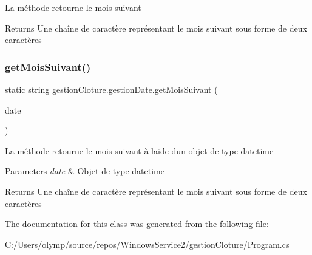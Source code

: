 La méthode retourne le mois suivant 

\begin{DoxyReturn}{Returns}
Une chaîne de caractère représentant le mois suivant sous forme de deux caractères
\end{DoxyReturn}
\mbox{\label{classgestion_cloture_1_1gestion_date_abb6535d1c83722cb363400786129d6da}} 
\subsubsection{\texorpdfstring{get\+Mois\+Suivant()}{getMoisSuivant()}\hspace{0.1cm}{\footnotesize\ttfamily [2/2]}}
{\footnotesize\ttfamily static string gestion\+Cloture.\+gestion\+Date.\+get\+Mois\+Suivant (\begin{DoxyParamCaption}\item[{Date\+Time}]{date }\end{DoxyParamCaption})\hspace{0.3cm}{\ttfamily [static]}}



La méthode retourne le mois suivant à l\textquotesingle{}aide d\textquotesingle{}un objet de type datetime 


\begin{DoxyParams}{Parameters}
{\em date} & Objet de type datetime\\
\hline
\end{DoxyParams}
\begin{DoxyReturn}{Returns}
Une chaîne de caractère représentant le mois suivant sous forme de deux caractères
\end{DoxyReturn}


The documentation for this class was generated from the following file\+:\begin{DoxyCompactItemize}
\item 
C\+:/\+Users/olymp/source/repos/\+Windows\+Service2/gestion\+Cloture/Program.\+cs\end{DoxyCompactItemize}
